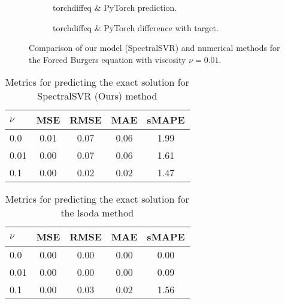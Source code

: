 \begin{figure}[H]
\begin{adjustwidth}{-0.05\linewidth}{-0.05\linewidth}
\begin{subfigure}{0.49\linewidth}
    \end{subfigure}
    \begin{subfigure}{0.49\linewidth}
      \begin{adjustbox}{width=\linewidth}
        
      \end{adjustbox}
      \caption{torchdiffeq \& PyTorch prediction.}\label{fig:comp_tdo_pred_0.01}
    \end{subfigure}
    \begin{subfigure}{0.49\linewidth}
      \begin{adjustbox}{width=\linewidth}
        
      \end{adjustbox}
      \caption{torchdiffeq \& PyTorch difference with target.}\label{fig:comp_tdo_diff_0.01}
    \end{subfigure}
  \end{adjustwidth}
  \caption{Comparison of our model (SpectralSVR) and numerical methods for the Forced Burgers equation with viscosity \(\nu=0.01\).}\label{fig:comparison_burgers_0.01}
\end{figure}
\begin{table}
  \caption{Metrics for predicting the exact solution for SpectralSVR (Ours) method}\label{table:comparison_exact_metrics_model}
  \centering
  \begin{tabular}{lcccc}
    \toprule
    \(\nu \) & MSE  & RMSE & MAE  & sMAPE \\
    \midrule
    0.0      & 0.01 & 0.07 & 0.06 & 1.99  \\
    0.01     & 0.00 & 0.07 & 0.06 & 1.61  \\
    0.1      & 0.00 & 0.02 & 0.02 & 1.47  \\
    \bottomrule
  \end{tabular}
\end{table}
\begin{table}
  \caption{Metrics for predicting the exact solution for the lsoda method}\label{table:comparison_exact_metrics_lsoda}
  \centering
  \begin{tabular}{lcccc}
    \toprule
    \(\nu \) & MSE  & RMSE & MAE  & sMAPE \\
    \midrule
    0.0      & 0.00 & 0.00 & 0.00 & 0.00  \\
    0.01     & 0.00 & 0.00 & 0.00 & 0.09  \\
    0.1      & 0.00 & 0.03 & 0.02 & 1.56  \\
    \bottomrule
  \end{tabular}
\end{table}
